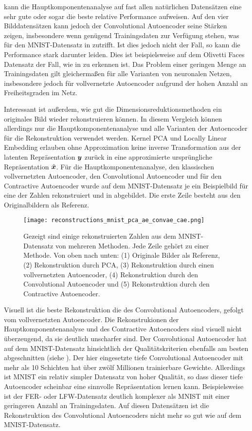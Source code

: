 kann die Hauptkomponentenanalyse auf fast allen natürlichen Datensätzen eine sehr gute oder sogar die
beste relative Performance aufweisen. Auf den vier Bilddatensätzen kann jedoch der Convolutional
Autoencoder seine Stärken zeigen, insbesondere wenn genügend Trainingsdaten zur Verfügung stehen, was für den MNIST-Datensatz in  zutrifft.
Ist dies jedoch nicht der Fall, so kann die Performance stark darunter leiden. Dies ist
beispielsweise auf dem Olivetti Faces Datensatz der Fall, wie in 
zu erkennen ist. Das Problem einer geringen Menge an Trainingsdaten gilt gleichermaßen für alle
Varianten von neuronalen Netzen, insbesondere jedoch für vollvernetzte Autoencoder aufgrund der
hohen Anzahl an Freiheitsgraden im Netz.

Interessant ist außerdem, wie gut die Dimensionsreduktionsmethoden ein originales Bild wieder
rekonstruieren können. In diesem Vergleich können allerdings nur die Hauptkomponentenanalyse und
alle Varianten der Autoencoder für die Rekonstruktion verwendet werden. Kernel PCA und Locally
Linear Embedding erlauben ohne Approximation keine inverse Transformation aus der latenten
Repräsentation $\bm{y}$ zurück in eine approximierte ursprüngliche Repräsentation
$\hat{\bm{x}}$. Für die Hauptkomponentenanalyse, den klassischen vollvernetzten
Autoencoder, den Convolutional Autoencoder und für den Contractive Autoencoder wurde auf dem
MNIST-Datensatz je ein Beispielbild für eine der Zahlen rekonstruiert und in
 abgebildet. Die erste Zeile besteht aus den Originalbildern als
Referenz.
\begin{figure}[ht]
	\centering
	\texttt{[image: reconstructions\_mnist\_pca\_ae\_convae\_cae.png]}
	\caption[Rekonstruktierte MNIST-Zahlen]{Gezeigt sind einige rekonstruierten Zahlen aus dem MNIST-Datensatz von mehreren Methoden. Jede Zeile gehört zu einer Methode. Von oben nach unten: (1) Originale Bilder als Referenz, (2) Rekonstruktion durch PCA, (3) Rekonstruktion durch einen vollvernetzten Autoencoder, (4) Rekonstruktion durch den Convolutional Autoencoder und (5) Rekonstruktion durch den Contractive Autoencoder.}
	\label{fig:MNIST-reconstructions}
\end{figure}
Visuell ist die beste Rekonstruktion die des Convolutional Autoencoders, gefolgt vom vollvernetzten Autoencoder. Die Rekonstrukionen der Hauptkomponentenanalyse und des Contractive Autoencoders sind visuell nicht überzeugend, da sie deutlich unscharfer sind. Der Convolutional Autoencoder hat auf dem MNIST-Datensatz hinsichtlich der Qualitätskriterien ebenfalls am besten abgeschnitten (siehe ). Der hier eingesetzte tiefe Convolutional Autoencoder mit mehr als 10 Schichten hat über zwölf Millionen trainierbare Gewichte. Allerdings ist MNIST ein relativ simpler Datensatz von hoher Qualität, so dass dieser tiefe Autoencoder scheinbar eine sinnvolle Repräsentation lernen kann. Beispielsweise ist der FER- oder LFW-Datensatz deutlich komplexer als MNIST mit einer geringeren Anzahl an Trainingsdaten. Auf diesen Datensätzen ist die Rekonstruktion des Convolutional Autoencoders nicht mehr so gut wie auf dem MNIST-Datensatz.

